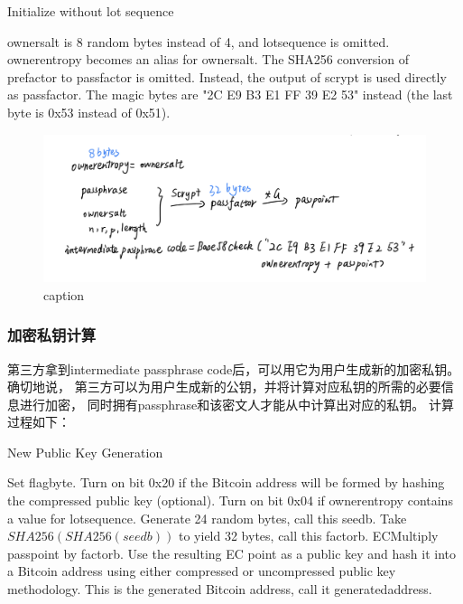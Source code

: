 \begin{algorithm}[tbp]\footnotesize
\caption{Initialize without lot sequence}
  	\begin{algorithmic}[1]
	    \STATE ownersalt is 8 random bytes instead of 4, and lotsequence is omitted. ownerentropy becomes an alias for ownersalt. 
		\STATE The SHA256 conversion of prefactor to passfactor is omitted. Instead, the output of scrypt is used directly as passfactor.
		\STATE The magic bytes are "2C E9 B3 E1 FF 39 E2 53" instead (the last byte is 0x53 instead of 0x51). 
    \end{algorithmic}
\end{algorithm}



\begin{figure}[h]
\centering
\includegraphics[width=.7\textwidth]{./im-code2.png}
\caption{caption}\label{fig-parsesig}
\end{figure}

\subsubsection{加密私钥计算}
第三方拿到intermediate passphrase code后，可以用它为用户生成新的加密私钥。确切地说，
第三方可以为用户生成新的公钥，并将计算对应私钥的所需的必要信息进行加密，
同时拥有passphrase和该密文人才能从中计算出对应的私钥。  
计算过程如下：

\begin{algorithm}[tbp]\footnotesize
\caption{New Public Key Generation}
  	\begin{algorithmic}[1]
	    \STATE Set flagbyte.
	    \STATE Turn on bit 0x20 if the Bitcoin address will be formed 
	    by hashing the compressed public key (optional). Turn on bit 0x04 
	    if ownerentropy contains a value for lotsequence.   
		\STATE Generate 24 random bytes, call this seedb. 
		Take $SHA256(SHA256(seedb))$ to yield 32 bytes, call this factorb.
		\STATE ECMultiply passpoint by factorb. Use the resulting EC point 
		as a public key and hash it into a Bitcoin address using either 
		compressed or uncompressed public key methodology. 
		This is the generated Bitcoin address, call it generatedaddress. 
    \end{algorithmic}
\end{algorithm}

